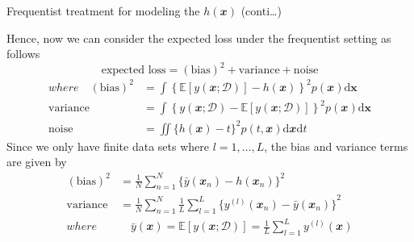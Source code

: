 \documentclass{bredelebeamer}
\begin{document}
\begin{frame}{Frequentist treatment for modeling the $h(\mathbfit{x})$ (conti\ldots)}
  \begin{justify}
    Hence, now we can consider the expected loss under the frequentist setting as follows
    \begin{equation}
      \textrm{expected loss} = (\textrm{bias})^2 + \textrm{variance} + \textrm{noise}
    \end{equation}
    \begin{equation}
      \begin{split}
        \mathit{where} \quad (\textrm{bias})^2
        &= \int {\left\{\mathbb{E}[y(\mathbfit{x};\mathcal{D})] - h(\mathbfit{x})\right\}}^2 p(\mathbfit{x}) \mathrm{d}\mathbf{x} \\
        \textrm{variance}
        &= \int {\left\{y(\mathbfit{x};\mathcal{D}) - \mathbb{E}[y(\mathbfit{x};\mathcal{D})]\right\}}^2 p(\mathbfit{x}) \mathrm{d}\mathbf{x} \\
        \textrm{noise}
        &= \iint {\{h(\mathbfit{x}) - t\}}^2 p(t,\mathbfit{x}) \mathrm{d}\mathbfit{x} \mathrm{d}t
      \end{split}
    \end{equation}
    Since we only have finite data sets where $l=1,\ldots,L$, the bias and variance terms are given by
    \begin{equation}
      \begin{split}
        (\textrm{bias})^2
        &= \frac{1}{N} \sum_{n=1}^{N} {\{\bar{y}(\mathbfit{x}_n) - h(\mathbfit{x}_n)\}}^2 \\
        \textrm{variance}
        &= \frac{1}{N} \sum_{n=1}^{N} \frac{1}{L} \sum_{l=1}^{L} {\{y^{(l)}(\mathbfit{x}_n) - \bar{y}(\mathbfit{x}_n)\}}^2 \\
        \mathit{where} &\quad \bar{y}(\mathbfit{x}) = \mathbb{E}[y(\mathbfit{x};\mathcal{D})] = \frac{1}{L} \sum_{l=1}^{L} y^{(l)}(\mathbfit{x})
      \end{split}
    \end{equation}
  \end{justify}
\end{frame}
\end{document}
